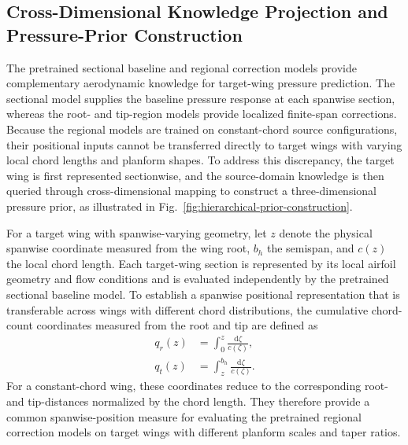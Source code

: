 
\subsection{Cross-Dimensional Knowledge Projection and Pressure-Prior Construction}
\label{sec:knowledge-projection}

The pretrained sectional baseline and regional correction models provide complementary aerodynamic knowledge for target-wing pressure prediction. The sectional model supplies the baseline pressure response at each spanwise section, whereas the root- and tip-region models provide localized finite-span corrections. Because the regional models are trained on constant-chord source configurations, their positional inputs cannot be transferred directly to target wings with varying local chord lengths and planform shapes. To address this discrepancy, the target wing is first represented sectionwise, and the source-domain knowledge is then queried through cross-dimensional mapping to construct a three-dimensional pressure prior, as illustrated in Fig.~\ref{fig:hierarchical-prior-construction}.

For a target wing with spanwise-varying geometry, let $z$ denote the physical spanwise coordinate measured from the wing root, $b_h$ the semispan, and $c(z)$ the local chord length. Each target-wing section is represented by its local airfoil geometry and flow conditions and is evaluated independently by the pretrained sectional baseline model. To establish a spanwise positional representation that is transferable across wings with different chord distributions, the cumulative chord-count coordinates measured from the root and tip are defined as
\begin{equation}
\begin{aligned}
q_r(z) &= \int_0^z \frac{\mathrm{d}\zeta}{c(\zeta)},\\
q_t(z) &= \int_z^{b_h} \frac{\mathrm{d}\zeta}{c(\zeta)}.
\end{aligned}
\label{eq:integrated-chord-coordinates}
\end{equation}
For a constant-chord wing, these coordinates reduce to the corresponding root- and tip-distances normalized by the chord length. They therefore provide a common spanwise-position measure for evaluating the pretrained regional correction models on target wings with different planform scales and taper ratios.

